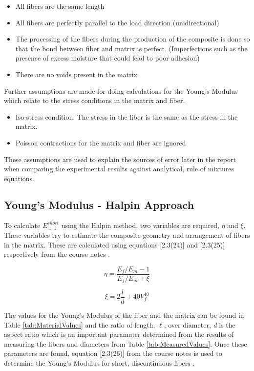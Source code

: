 \documentclass[11pt]{article}
\begin{document}
\begin{itemize}
\item All fibers are the same length
\item All fibers are perfectly parallel to the load direction (unidirectional)
\item The processing of the fibers during the production of the composite is done so that the bond between fiber and matrix is perfect. (Imperfections such as the presence of excess moisture that could lead to poor adhesion)
\item There are no voids present in the matrix
\end{itemize}

Further assumptions are made for doing calculations for the Young's Modulus which relate to the stress conditions in the matrix and fiber.

\begin{itemize}
\item Iso-stress condition. The stress in the fiber is the same as the stress in the matrix.
\item Poisson contractions for the matrix and fiber are ignored
\end{itemize}

These assumptions are used to explain the sources of error later in the report when comparing the experimental results against analytical, rule of mixtures equations.


\subsection{Young's Modulus - Halpin Approach}

To calculate \(E_{\downarrow \downarrow}^{short}\) using the Halpin method, two variables are required, \(\eta\) and \(\xi\). These variables try to estimate the composite geometry and arrangement of fibers in the matrix. These are calculated using equations [2.3(24)] and [2.3(25)] respectively from the course notes \cite{course_notes}.

\begin{equation}
\eta = \frac{E_f/E_m-1}{E_f/E_m+\xi}
\end{equation}

\begin{equation}
\xi = 2 \frac{l}{d} +40V^{10}_f
\end{equation}

The values for the Young's Modulus of the fiber and the matrix can be found in Table \ref{tab:MaterialValues} and the ratio of  length, \(\ell\), over diameter, \textit{d} is the aspect ratio which is an important paramater determined from the results of measuring the fibers and diameters from Table \ref{tab:MeasuredValues}. Once these parameters are found, equation [2.3(26)] from the course notes is used to determine the Young's Modulus for short, discontinuous fibers \cite{course_notes}.
\end{document}

